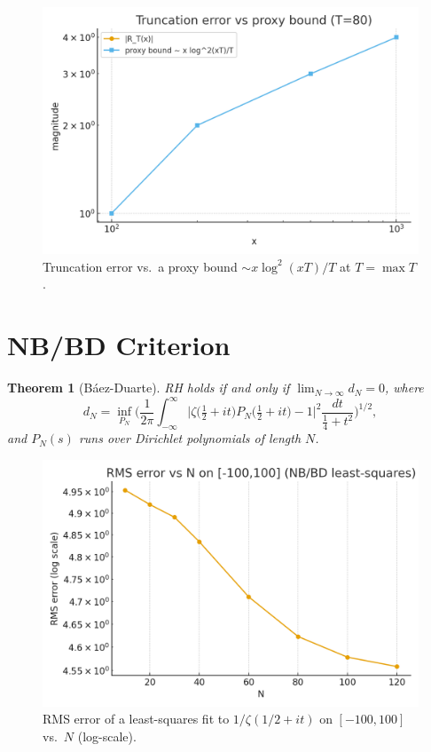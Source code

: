 \documentclass[12pt]{article}
\theoremstyle{plain}
\newtheorem{theorem}{Theorem}[section]
\begin{document}
\begin{figure}[h!]
\centering
\includegraphics[width=0.8\linewidth]{figB_truncation_vs_bound.png}
\caption{Truncation error vs.\ a proxy bound $\sim x\log^2(xT)/T$ at $T=\max T$.}
\end{figure}

\section{NB/BD Criterion}
\begin{theorem}[B\'aez-Duarte]
RH holds if and only if $\lim_{N\to\infty} d_N = 0$, where
\begin{equation}
d_N = \inf_{P_N}\Bigg(\frac{1}{2\pi}\int_{-\infty}^{\infty}
\Big|\zeta\!\big(\tfrac12+it\big)P_N\!\big(\tfrac12+it\big)-1\Big|^2
\frac{dt}{\tfrac14+t^2}\Bigg)^{1/2},
\end{equation}
and $P_N(s)$ runs over Dirichlet polynomials of length $N$.
\end{theorem}

\begin{figure}[h!]
\centering
\includegraphics[width=0.7\linewidth]{figC_bd_rms_vs_N.png}
\caption{RMS error of a least-squares fit to $1/\zeta(1/2+it)$ on $[-100,100]$ vs.\ $N$ (log-scale).}
\end{figure}
\end{document}
